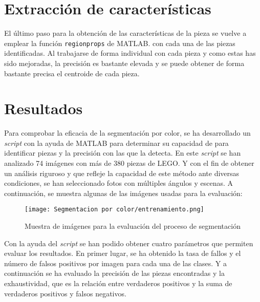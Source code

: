 \clearpage
\section{Extracción de características}
El último paso para la obtención de las características de la pieza se vuelve a emplear la función \texttt{regionprops} de MATLAB. con cada una de las piezas identificadas. Al trabajarse de forma individual con cada pieza y como estas has sido mejoradas, la precisión es bastante elevada y se puede obtener de forma bastante precisa el centroide de cada pieza.

\section{Resultados}
\label{sec:color resultados}
Para comprobar la eficacia de la segmentación por color, se ha desarrollado un \textit{script} con la ayuda de MATLAB para determinar su capacidad de para identificar piezas y la precisión con las que la detecta. En este \textit{script} se han analizado 74 imágenes con más de 380 piezas de LEGO. Y con el fin de obtener un análisis riguroso y que refleje la capacidad de este método ante diversas condiciones, se han seleccionado fotos con múltiples ángulos y escenas. A continuación, se muestra algunas de las imágenes usadas para la evaluación:

\begin{figure}[ht]  %
	\centering
	\texttt{[image: Segmentacion por color/entrenamiento.png]}
	\caption{Muestra de imágenes para la evaluación del proceso de segmentación}
	\label{fig:entrenamiento}
\end{figure}

Con la ayuda del \textit{script} se han podido obtener cuatro parámetros que permiten evaluar los resultados. En primer lugar, se ha obtenido la tasa de fallos y el número de falsos positivos por imagen para cada una de las clases. Y a continuación se ha evaluado la precisión de las piezas encontradas y la exhaustividad, que es la relación entre verdaderos positivos y la suma de verdaderos positivos y falsos negativos.

